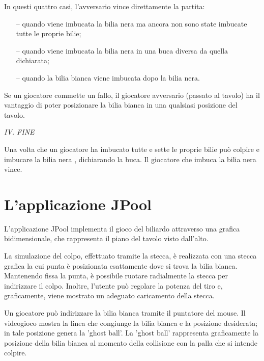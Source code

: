 \documentclass[12pt,a4paper]{report}
\begin{document}
\pagebreak
In questi quattro casi, l'avversario vince direttamente la partita:
\begin{itemize}[noitemsep]
    \item[--] quando viene imbucata la bilia nera ma ancora non sono state imbucate tutte le proprie bilie;
    \item[--] quando viene imbucata la bilia nera in una buca diversa da quella dichiarata;
    \item[--] quando la bilia bianca viene imbucata dopo la bilia nera.
\end{itemize}

Se un giocatore commette un fallo, il giocatore avversario (passato al tavolo) ha il vantaggio di poter posizionare la bilia bianca in una qualsiasi posizione del tavolo.

\vspace{9mm}
\noindent \emph{IV. FINE}

Una volta che un giocatore ha imbucato tutte e sette le proprie bilie può colpire e imbucare la bilia nera , dichiarando la buca.
Il giocatore che imbuca la bilia nera vince.

\section{L'applicazione JPool}\label{se:JPool} %
L'applicazione JPool implementa il gioco del biliardo attraverso una grafica bidimensionale, che rappresenta il piano del tavolo visto dall'alto.

\vspace{3mm}

La simulazione del colpo, effettuato tramite la stecca, è realizzata con una stecca grafica la cui punta è posizionata esattamente dove si trova la bilia bianca.
Mantenendo fissa la punta, è possibile ruotare radialmente la stecca per indirizzare il colpo.
Inoltre, l'utente può regolare la potenza del tiro e, graficamente, viene mostrato un adeguato caricamento della stecca.

\vspace{3mm}

Un giocatore può indirizzare la bilia bianca tramite il puntatore del mouse.
Il videogioco mostra la linea che congiunge la bilia bianca e la posizione desiderata; in tale posizione genera la 'ghost ball'.
La 'ghost ball' rappresenta graficamente la posizione della bilia bianca al momento della collisione con la palla che si intende colpire.

\vspace{3mm}
\end{document}
